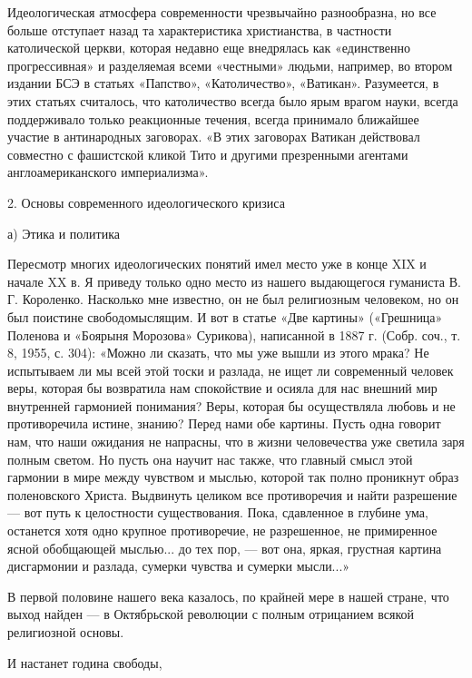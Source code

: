 Идеологическая  атмосфера современности  чрезвычайно разнообразна,  но
все больше отступает назад та характеристика христианства, в частности
католической церкви,  которая недавно еще внедрялась  как «единственно
прогрессивная»  и разделяемая  всеми «честными»  людьми, например,  во
втором  издании БСЭ  в статьях  «Папство», «Католичество»,  «Ватикан».
Разумеется,  в этих  статьях считалось,  что католичество  всегда было
ярым  врагом науки,  всегда поддерживало  только реакционные  течения,
всегда принимало  ближайшее участие в антинародных  заговорах. «В этих
заговорах  Ватикан действовал  совместно  с фашистской  кликой Тито  и
другими презренными агентами англоамериканского империализма».

2. Основы современного идеологического кризиса

а) Этика и политика

Пересмотр многих идеологических  понятий имел место уже в  конце XIX и
начале  XX  в. Я  приведу  только  одно  место из  нашего  выдающегося
гуманиста  В.  Г.  Короленко.  Насколько   мне  известно,  он  не  был
религиозным  человеком,  но он  был  поистине  свободомыслящим. И  вот
в  статье  «Две картины»  («Грешница»  Поленова  и «Боярыня  Морозова»
Сурикова), написанной  в 1887  г. (Собр.  соч., т.  8, 1955,  с. 304):
«Можно ли сказать,  что мы уже вышли из этого  мрака? Не испытываем ли
мы всей  этой тоски и  разлада, не  ищет ли современный  человек веры,
которая бы  возвратила нам  спокойствие и осияла  для нас  внешний мир
внутренней гармонией понимания? Веры, которая бы осуществляла любовь и
не противоречила  истине, знанию? Перед  нами обе картины.  Пусть одна
говорит нам, что  наши ожидания не напрасны, что  в жизни человечества
уже светила  заря полным светом.  Но пусть  она научит нас  также, что
главный смысл  этой гармонии в  мире между чувством и  мыслью, которой
так  полно  проникнут  образ поленовского  Христа.  Выдвинуть  целиком
все  противоречия  и  найти  разрешение ---  вот  путь  к  целостности
существования.  Пока, сдавленное  в глубине  ума, останется  хотя одно
крупное противоречие, не разрешенное,  не примиренное ясной обобщающей
мыслью... до тех пор, --- вот она, яркая, грустная картина дисгармонии
и разлада, сумерки чувства и сумерки мысли...»

В  первой половине  нашего  века  казалось, по  крайней  мере в  нашей
стране,  что  выход  найден  ---  в  Октябрьской  революции  с  полным
отрицанием всякой религиозной основы.

И настанет година свободы,

